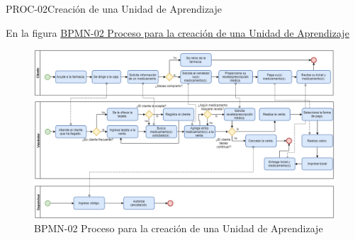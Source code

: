 \begin{BPMN}{PROC-02}{Creación de una Unidad de Aprendizaje}{}
\end{BPMN}
En la figura \hyperref[fig:BPMN-02]{BPMN-02 Proceso para la creación de una Unidad de Aprendizaje}

\begin{figure}[htbp]
	\begin{center}
		\includegraphics[width=.95\textwidth]{C1-DP/SP1/IG-SP1/BPMN-02}
		\caption{BPMN-02 Proceso para la creación de una Unidad de Aprendizaje}
		\label{fig:BPMN-02}
	\end{center}
\end{figure}